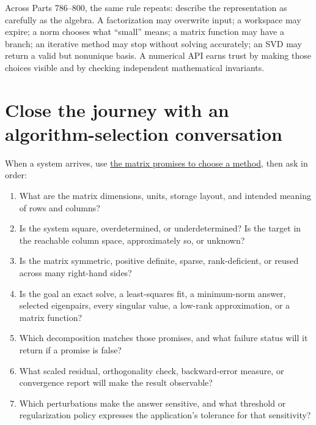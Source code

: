 Across Parts 786--800, the same rule repeats: describe the representation as carefully as the algebra. A factorization may overwrite input; a workspace may expire; a norm chooses what ``small'' means; a matrix function may have a branch; an iterative method may stop without solving accurately; an SVD may return a valid but nonunique basis. A numerical API earns trust by making those choices visible and by checking independent mathematical invariants.

\section{Close the journey with an algorithm-selection conversation}\label{02-foundations-ii-ch038-close-the-journey-with-an-algorithm-selection-conversation}

\hypertarget{02-foundations-ii-ch038-close-the-journey-with-an-algorithm-selection-conversation}{}

When a system arrives, use \hyperref[02-foundations-ii-ch038-choose-a-factorization-from-structure-and-the-requested-answer]{the matrix promises to choose a method}, then ask in order:

\begin{enumerate}
\def\labelenumi{\arabic{enumi}.}
\tightlist
\item
  What are the matrix dimensions, units, storage layout, and intended meaning of rows and columns?
\item
  Is the system square, overdetermined, or underdetermined? Is the target in the reachable column space, approximately so, or unknown?
\item
  Is the matrix symmetric, positive definite, sparse, rank-deficient, or reused across many right-hand sides?
\item
  Is the goal an exact solve, a least-squares fit, a minimum-norm answer, selected eigenpairs, every singular value, a low-rank approximation, or a matrix function?
\item
  Which decomposition matches those promises, and what failure status will it return if a promise is false?
\item
  What scaled residual, orthogonality check, backward-error measure, or convergence report will make the result observable?
\item
  Which perturbations make the answer sensitive, and what threshold or regularization policy expresses the application's tolerance for that sensitivity?
\end{enumerate}

